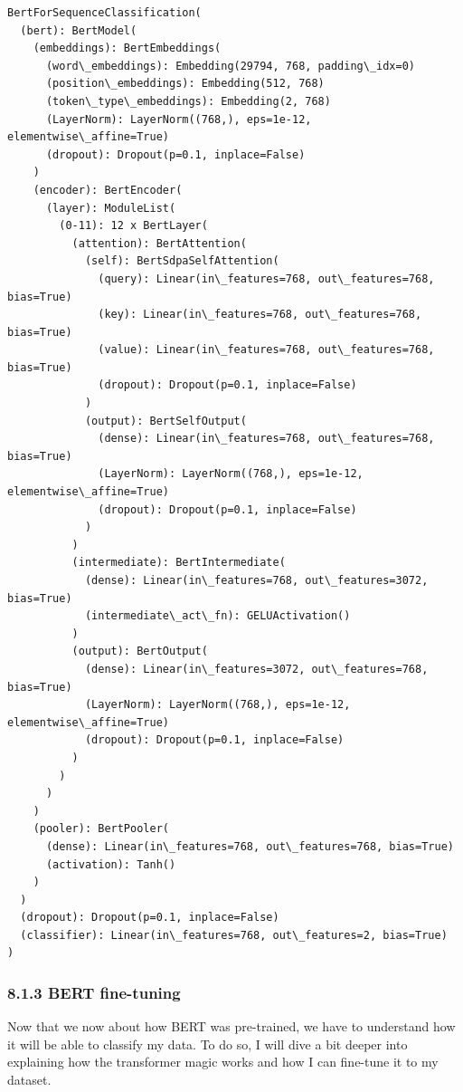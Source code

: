 \documentclass[11pt]{article}
\makeatletter
\newcommand{\boxspacing}{\kern\kvtcb@left@rule\kern\kvtcb@boxsep}
\newcommand{\prompt}[4]{
        {\ttfamily\llap{{\color{#2}[#3]:\hspace{3pt}#4}}\vspace{-\baselineskip}}
    }
\makeatother
\begin{document}
            \begin{tcolorbox}[breakable, size=fbox, boxrule=.5pt, pad at break*=1mm, opacityfill=0]
\prompt{Out}{outcolor}{14}{\boxspacing}
\begin{Verbatim}[commandchars=\\\{\}]
BertForSequenceClassification(
  (bert): BertModel(
    (embeddings): BertEmbeddings(
      (word\_embeddings): Embedding(29794, 768, padding\_idx=0)
      (position\_embeddings): Embedding(512, 768)
      (token\_type\_embeddings): Embedding(2, 768)
      (LayerNorm): LayerNorm((768,), eps=1e-12, elementwise\_affine=True)
      (dropout): Dropout(p=0.1, inplace=False)
    )
    (encoder): BertEncoder(
      (layer): ModuleList(
        (0-11): 12 x BertLayer(
          (attention): BertAttention(
            (self): BertSdpaSelfAttention(
              (query): Linear(in\_features=768, out\_features=768, bias=True)
              (key): Linear(in\_features=768, out\_features=768, bias=True)
              (value): Linear(in\_features=768, out\_features=768, bias=True)
              (dropout): Dropout(p=0.1, inplace=False)
            )
            (output): BertSelfOutput(
              (dense): Linear(in\_features=768, out\_features=768, bias=True)
              (LayerNorm): LayerNorm((768,), eps=1e-12, elementwise\_affine=True)
              (dropout): Dropout(p=0.1, inplace=False)
            )
          )
          (intermediate): BertIntermediate(
            (dense): Linear(in\_features=768, out\_features=3072, bias=True)
            (intermediate\_act\_fn): GELUActivation()
          )
          (output): BertOutput(
            (dense): Linear(in\_features=3072, out\_features=768, bias=True)
            (LayerNorm): LayerNorm((768,), eps=1e-12, elementwise\_affine=True)
            (dropout): Dropout(p=0.1, inplace=False)
          )
        )
      )
    )
    (pooler): BertPooler(
      (dense): Linear(in\_features=768, out\_features=768, bias=True)
      (activation): Tanh()
    )
  )
  (dropout): Dropout(p=0.1, inplace=False)
  (classifier): Linear(in\_features=768, out\_features=2, bias=True)
)
\end{Verbatim}
\end{tcolorbox}
        
    \subsubsection{8.1.3 BERT fine-tuning}\label{bert-fine-tuning}

Now that we now about how BERT was pre-trained, we have to understand
how it will be able to classify my data. To do so, I will dive a bit
deeper into explaining how the transformer magic works and how I can
fine-tune it to my dataset.
\end{document}
